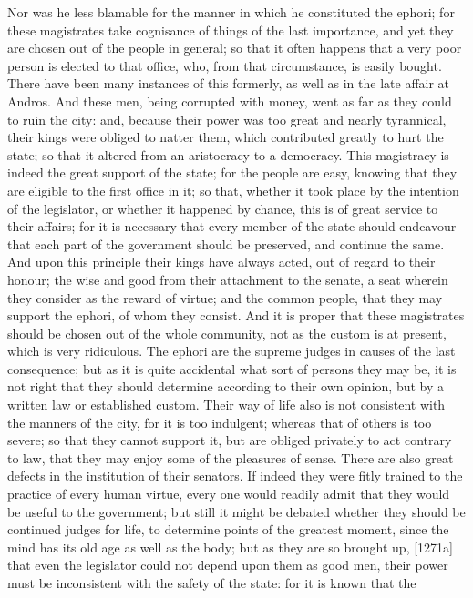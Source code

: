 Nor was he less blamable for the manner in which he constituted the
ephori; for these magistrates take cognisance of things of the last
importance, and yet they are chosen out of the people in general; so that
it often happens that a very poor person is elected to that office, who,
from that circumstance, is easily bought. There have been many instances
of this formerly, as well as in the late affair at Andros. And these men,
being corrupted with money, went as far as they could to ruin the city:
and, because their power was too great and nearly tyrannical, their kings
were obliged to natter them, which contributed greatly to hurt the state;
so that it altered from an aristocracy to a democracy. This magistracy is
indeed the great support of the state; for the people are easy, knowing
that they are eligible to the first office in it; so that, whether it took
place by the intention of the legislator, or whether it happened by
chance, this is of great service to their affairs; for it is necessary
that every member of the state should endeavour that each part of the
government should be preserved, and continue the same. And upon this
principle their kings have always acted, out of regard to their honour;
the wise and good from their attachment to the senate, a seat wherein they
consider as the reward of virtue; and the common people, that they may
support the ephori, of whom they consist. And it is proper that these
magistrates should be chosen out of the whole community, not as the custom
is at present, which is very ridiculous. The ephori are the supreme judges
in causes of the last consequence; but as it is quite accidental what sort
of persons they may be, it is not right that they should determine
according to their own opinion, but by a written law or established
custom. Their way of life also is not consistent with the manners of the
city, for it is too indulgent; whereas that of others is too severe; so
that they cannot support it, but are obliged privately to act contrary to
law, that they may enjoy some of the pleasures of sense. There are also
great defects in the institution of their senators. If indeed they were
fitly trained to the practice of every human virtue, every one would
readily admit that they would be useful to the government; but still it
might be debated whether they should be continued judges for life, to
determine points of the greatest moment, since the mind has its old age as
well as the body; but as they are so brought up, [1271a] that even the
legislator could not depend upon them as good men, their power must be
inconsistent with the safety of the state: for it is known that the
